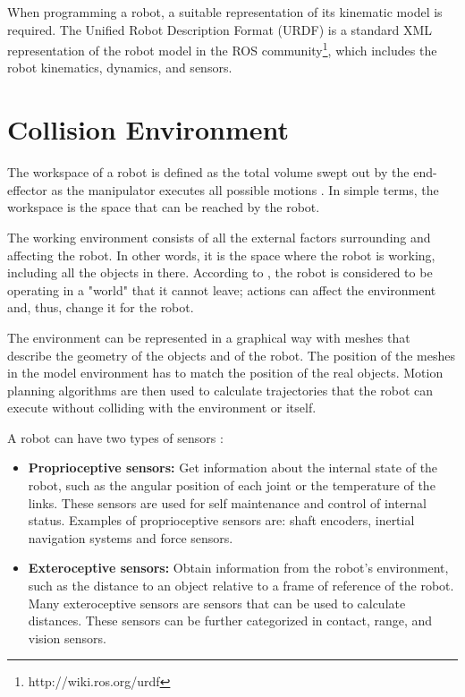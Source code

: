 When programming a robot, a suitable representation of its kinematic model is required. The Unified Robot Description Format (URDF) is a standard XML representation of the robot model in the ROS community\footnote{http://wiki.ros.org/urdf}, which includes the robot kinematics, dynamics, and sensors. %

\section{Collision Environment}

The workspace of a robot is defined as the total volume swept out by the end-effector as the manipulator executes all possible motions \citep[chap. 1]{Handbook}. In simple terms, the workspace is the space that can be reached by the robot.

The working environment consists of all the external factors surrounding and affecting the robot. In other words, it is the space where the robot is working, including all the objects in there. According to \citet{Taskspace}, the robot is considered to be operating in a "world" that it cannot leave; actions can affect the environment and, thus, change it for the robot. 

The environment can be represented in a graphical way with meshes that describe the geometry of the objects and of the robot. The position of the meshes in the model environment has to match the position of the real objects. Motion planning algorithms are then used to calculate trajectories that the robot can execute without colliding with the environment or itself. 

A robot can have two types of sensors \citep[chap. 1]{Russel}:
\begin{itemize}
	\item \textbf{Proprioceptive sensors:} Get information about the internal state of the robot, such as the angular position of each joint or the temperature of the links. These sensors are used for self maintenance and control of internal status. Examples of proprioceptive sensors are: shaft encoders, inertial navigation systems and force sensors.
	\item \textbf{Exteroceptive sensors:} Obtain information from the robot's environment, such as the distance to an object relative to a frame of reference of the robot. Many exteroceptive sensors are sensors that can be used to calculate distances. These sensors can be further categorized in contact, range, and vision sensors.
\end{itemize}

